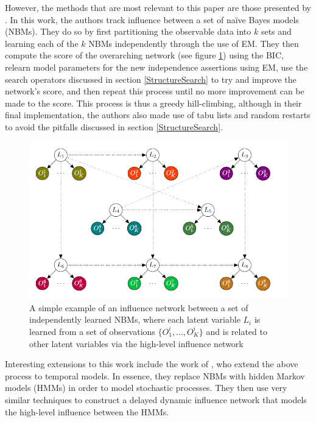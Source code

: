 \documentclass [11pt]{article}
\begin{document}
However, the methods that are most relevant to this paper are those presented by \cite{ajoodha17}. In this work, the authors track influence between a set of na\"{i}ve Bayes models (NBMs). They do so by first partitioning the observable data into $k$ sets and learning each of the $k$ NBMs independently through the use of EM. They then compute the score of the overarching network (see figure \ref{fig:ajoodha}) using the BIC, relearn model parameters for the new independence assertions using EM, use the search operators discussed in section \ref{StructureSearch} to try and improve the network's score, and then repeat this process until no more improvement can be made to the score. This process is thus a greedy hill-climbing, although in their final implementation, the authors also made use of tabu lists and random restarts to avoid the pitfalls discussed in section \ref{StructureSearch}.
\begin{figure}[H]\label{fig:ajoodha}
\centering
\caption{A simple example of an influence network between a set of independently learned NBMs, where each latent variable $L_{i}$ is learned from a set of observations $\{O_{1}^{i},...,O_{K}^{i}\}$ and is related to other latent variables via the high-level influence network \citep{ajoodha17}}
\includegraphics[width=12cm]{ajoodha.png}
\end{figure}
Interesting extensions to this work include the work of \cite{ajoodha18}, who extend the above process to temporal models. In essence, they replace NBMs with hidden Markov models (HMMs) in order to model stochastic processes. They then use very similar techniques to construct a delayed dynamic influence network that models the high-level influence between the HMMs.
\end{document}
